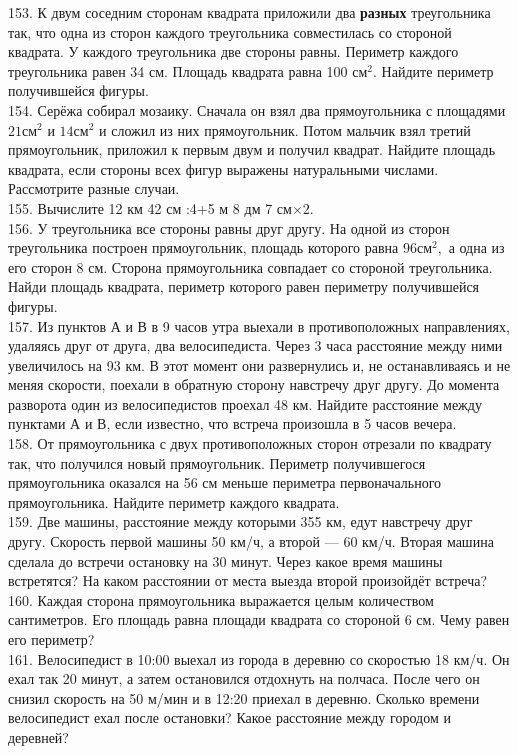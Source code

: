 \documentclass[12pt]{article}
\begin{document}
153. К двум соседним сторонам квадрата приложили два {\bf разных} треугольника так, что одна из сторон каждого треугольника совместилась со стороной квадрата. У каждого треугольника две стороны равны. Периметр каждого треугольника равен 34 см. Площадь квадрата равна 100 $\text{см}^2.$ Найдите периметр получившейся фигуры.\\
154. Серёжа собирал мозаику. Сначала он взял два прямоугольника с площадями $21\text{см}^2$ и $14\text{см}^2$ и сложил из них прямоугольник. Потом мальчик взял третий прямоугольник, приложил к первым двум и получил квадрат. Найдите площадь квадрата, если стороны всех фигур выражены натуральными числами. Рассмотрите разные случаи.\\
155. Вычислите 12 км 42 см :4+5 м 8 дм 7 см$\times2.$\\
156. У треугольника все стороны равны друг другу. На одной из сторон треугольника построен прямоугольник, площадь которого равна $96\text{см}^2,$ а одна из его сторон 8 см. Сторона прямоугольника совпадает со стороной треугольника. Найди площадь квадрата, периметр которого равен периметру получившейся фигуры.\\
157. Из пунктов А и В в 9 часов утра выехали в противоположных направлениях, удаляясь друг от друга, два велосипедиста. Через 3 часа расстояние между ними увеличилось на 93 км. В этот момент они развернулись и, не останавливаясь и не меняя скорости, поехали в обратную сторону навстречу друг другу. До момента разворота один из велосипедистов проехал 48 км. Найдите расстояние между пунктами А и В, если известно, что встреча произошла в 5 часов вечера.\\
158. От прямоугольника с двух противоположных сторон отрезали по квадрату так, что получился новый прямоугольник. Периметр получившегося прямоугольника оказался на 56 см меньше периметра первоначального прямоугольника. Найдите периметр каждого квадрата.\\
159. Две машины, расстояние между которыми 355 км, едут навстречу друг другу. Скорость первой машины 50 км/ч, а второй --- 60 км/ч. Вторая машина сделала до встречи остановку на 30 минут. Через какое время машины встретятся? На каком расстоянии от места выезда второй произойдёт встреча?\\
160. Каждая сторона прямоугольника выражается целым количеством сантиметров. Его площадь равна площади квадрата со стороной 6 см. Чему равен его периметр?\\
161. Велосипедист в 10:00 выехал из города в деревню со скоростью 18 км/ч. Он ехал так 20 минут, а затем остановился отдохнуть на полчаса. После чего он снизил скорость на 50 м/мин и в 12:20 приехал в деревню. Сколько времени велосипедист ехал после остановки? Какое расстояние между городом и деревней?\\
\end{document}
